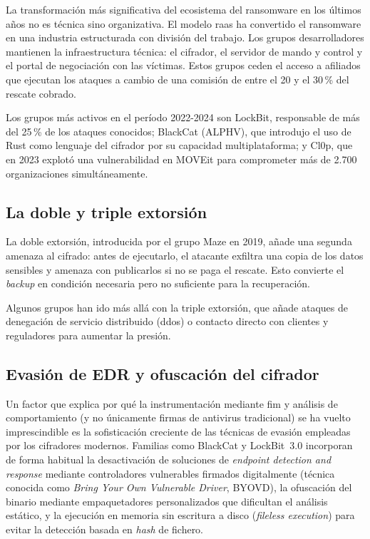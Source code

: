 \documentclass[../main.tex]{subfiles}
\begin{document}
La transformación más significativa del ecosistema del ransomware en los
últimos años no es técnica sino organizativa. El modelo \gls{raas} ha
convertido el ransomware en una industria estructurada con división del
trabajo. Los grupos desarrolladores mantienen la infraestructura técnica:
el cifrador, el servidor de mando y control y el portal de negociación
con las víctimas. Estos grupos ceden el acceso a afiliados que ejecutan
los ataques a cambio de una comisión de entre el 20 y el 30\,\% del
rescate cobrado.

Los grupos más activos en el período 2022-2024 son LockBit, responsable
de más del 25\,\% de los ataques conocidos; BlackCat (ALPHV), que introdujo
el uso de Rust como lenguaje del cifrador por su capacidad multiplataforma;
y Cl0p, que en 2023 explotó una vulnerabilidad en MOVEit para comprometer
más de 2.700 organizaciones simultáneamente.

\subsection{La doble y triple extorsión}

La doble extorsión, introducida por el grupo Maze en 2019, añade una
segunda amenaza al cifrado: antes de ejecutarlo, el atacante exfiltra una
copia de los datos sensibles y amenaza con publicarlos si no se paga el
rescate. Esto convierte el \textit{backup} en condición necesaria pero no
suficiente para la recuperación.

Algunos grupos han ido más allá con la triple extorsión, que añade ataques
de denegación de servicio distribuido (\gls{ddos}) o contacto directo con
clientes y reguladores para aumentar la presión.

\subsection{Evasión de EDR y ofuscación del cifrador}
\label{sec:evasion-edr}

Un factor que explica por qué la instrumentación mediante \gls{fim} y
análisis de comportamiento (y no únicamente firmas de antivirus
tradicional) se ha vuelto imprescindible es la sofisticación creciente
de las técnicas de evasión empleadas por los cifradores modernos. Familias
como BlackCat y LockBit~3.0 incorporan de forma habitual la desactivación
de soluciones de \textit{endpoint detection and response} mediante
controladores vulnerables firmados digitalmente (técnica conocida como
\textit{Bring Your Own Vulnerable Driver}, BYOVD), la ofuscación del binario mediante
empaquetadores personalizados que dificultan el análisis estático, y la
ejecución en memoria sin escritura a disco (\textit{fileless execution})
para evitar la detección basada en \textit{hash} de fichero.
\end{document}
